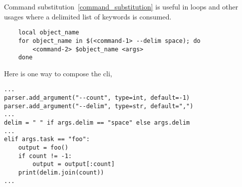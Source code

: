 Command substitution~\ref{command_substitution} is useful in  loops and other usages where a delimited list of keywords is consumed.
%
\begin{verbatim}
    local object_name
    for object_name in $(<command-1> --delim space); do
        <command-2> $object_name <args>
    done
\end{verbatim}
%
Here is one way to compose the  cli,
%
\begin{verbatim}
...
parser.add_argument("--count", type=int, default=-1)
parser.add_argument("--delim", type=str, default=",")
...
delim = " " if args.delim == "space" else args.delim
...
elif args.task == "foo":
    output = foo()
    if count != -1:
        output = output[:count]
    print(delim.join(count))
...
\end{verbatim}